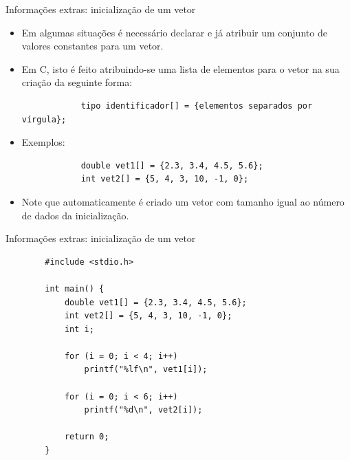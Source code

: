 \documentclass[handout]{beamer}
\begin{document}
\begin{frame}[fragile]{Informações extras: inicialização de um vetor}

    \begin{itemize}
        \item Em algumas situações é necessário declarar e já atribuir um conjunto de valores constantes para um vetor.
        \item Em C, isto é feito atribuindo-se uma lista de elementos para o vetor na sua criação da seguinte forma:

        \begin{verbatim}
            tipo identificador[] = {elementos separados por vírgula};
        \end{verbatim}

        \pause

        \item Exemplos:
        \begin{verbatim}
            double vet1[] = {2.3, 3.4, 4.5, 5.6};
            int vet2[] = {5, 4, 3, 10, -1, 0};
        \end{verbatim}

        \item Note que automaticamente é criado um vetor com tamanho igual ao número de dados da inicialização.
    \end{itemize}

\end{frame}

\begin{frame}[fragile]{Informações extras: inicialização de um vetor}

    \begin{verbatim}
        #include <stdio.h>

        int main() {
            double vet1[] = {2.3, 3.4, 4.5, 5.6};
            int vet2[] = {5, 4, 3, 10, -1, 0};
            int i;

            for (i = 0; i < 4; i++)
                printf("%lf\n", vet1[i]);

            for (i = 0; i < 6; i++)
                printf("%d\n", vet2[i]);
            
            return 0;
        }
    \end{verbatim}

\end{frame}
\end{document}
